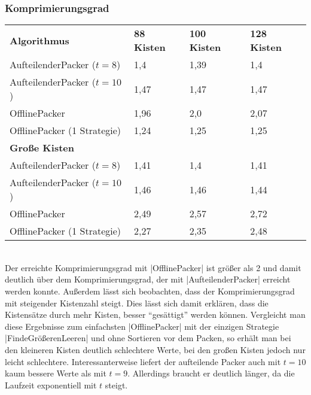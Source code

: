 \subsubsection*{Komprimierungsgrad}
\begin{tabular}{llll}
\textbf{Algorithmus} 	& \textbf{88 Kisten} 	& \textbf{100 Kisten} 	& \textbf{128 Kisten} 	\\
 AufteilenderPacker ($t=8$)  	& 1,4		& 1,39			& 1,4			\\
 AufteilenderPacker ($t=10$)	& 1,47		& 1,47			& 1,47			\\
 OfflinePacker			& 1,96		& 2,0			& 2,07			\\
 OfflinePacker (1 Strategie)	& 1,24		& 1,25			& 1,25		\vspace*{.48em} \\
\textbf{Große Kisten} & & & \\
 AufteilenderPacker ($t=8$)  	& 1,41		& 1,4			& 1,41			\\
 AufteilenderPacker ($t=10$)	& 1,46		& 1,46			& 1,44			\\
 OfflinePacker			& 2,49		& 2,57			& 2,72			\\
 OfflinePacker (1 Strategie)	& 2,27		& 2,35			& 2,48			\\
\end{tabular}\\

 Der erreichte Komprimierungsgrad mit |OfflinePacker| ist größer als 2 und damit deutlich über dem Komprimierungsgrad, der mit |AufteilenderPacker|
  erreicht werden konnte. Außerdem lässt sich beobachten, dass der Komprimierungsgrad mit steigender Kistenzahl steigt.
 Dies lässt sich damit erklären, dass die Kistensätze durch mehr Kisten, besser ``gesättigt'' werden können.
 Vergleicht man diese Ergebnisse zum einfachsten |OfflinePacker| mit der einzigen Strategie |FindeGrößerenLeeren| und ohne Sortieren vor dem Packen,
  so erhält man bei den kleineren Kisten deutlich schlechtere Werte, bei den großen Kisten jedoch nur leicht schlechtere.
 Interessanterweise liefert der aufteilende Packer auch mit $t=10$ kaum bessere Werte als mit $t=9$.
 Allerdings braucht er deutlich länger, da die Laufzeit exponentiell mit $t$ steigt.

